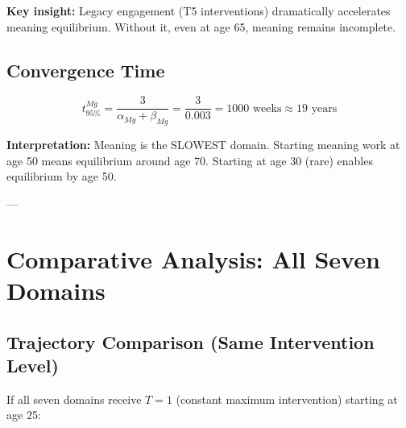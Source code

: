\textbf{Key insight:} Legacy engagement (T5 interventions) dramatically accelerates meaning
equilibrium. Without it, even at age 65, meaning remains incomplete.

\subsection{Convergence Time}

\begin{equation}
t_{95\%}^{Mg} = \frac{3}{\alpha_{Mg} + \beta_{Mg}} = \frac{3}{0.003} = 1000 \text{ weeks} \approx 19 \text{ years}
\end{equation}

\textbf{Interpretation:} Meaning is the SLOWEST domain. Starting meaning work at age 50
means equilibrium around age 70. Starting at age 30 (rare) enables equilibrium by age 50.

---


\section{Comparative Analysis: All Seven Domains}
\label{ooo:comparison}

\subsection{Trajectory Comparison (Same Intervention Level)}

If all seven domains receive $T = 1$ (constant maximum intervention) starting at age 25:

